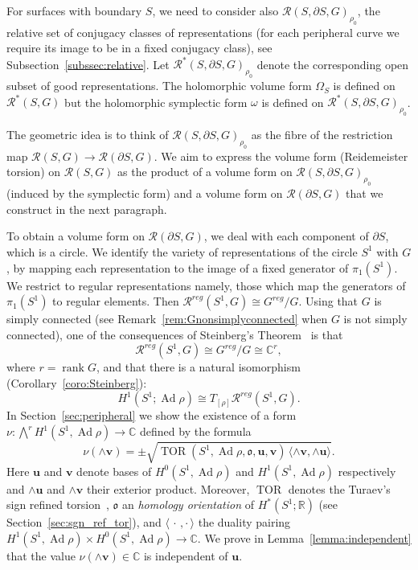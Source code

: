\documentclass[11pt]{article}
\theoremstyle{definition}
\numberwithin{equation}{section}
\numberwithin{figure}{section}
\numberwithin{table}{section}
\DeclareMathOperator{\TOR}{TOR}
\DeclareMathOperator{\Ad}{Ad}
\DeclareMathOperator{\rank}{rank}
\newcommand{\Rcal}{\mathcal{R}}
\newcommand{\Cbb}{\mathbb{C}}
\newcommand{\Rbb}{\mathbb {R}}
\newcommand{\ofrk}{\mathfrak{o}}
\newcommand{\ubf}{\mathbf{u}}
\newcommand{\vbf}{\mathbf{v}}
\newcommand*\Rg{\Rcal^*}
\begin{document}
For surfaces with boundary $S$, we need to consider also $\Rcal(S,\partial S,G)_{\rho_0}$, the relative set of conjugacy classes of representations (for each peripheral curve we require its image to be in a fixed conjugacy class), see Subsection~\ref{subssec:relative}. Let $\Rg(S,\partial S,G)_{\rho_0}$ denote the corresponding open subset of good representations. The holomorphic volume form $\Omega_S$ is defined on $\Rg(S,G)$ but the holomorphic symplectic form $\omega$ is defined on $\Rg(S,\partial S,G)_{\rho_0}$.

The geometric idea is to think of $\Rcal(S,\partial S,G)_{\rho_0}$ as the fibre of the restriction map $\Rcal(S,G)\to \Rcal(\partial S,G)$. We aim to express the volume form (Reidemeister torsion) on $\Rcal(S,G)$ as the product of a volume form on $\Rcal(S,\partial S,G)_{\rho_0}$ (induced by the symplectic form) and a volume form on $\Rcal(\partial S,G)$ that we construct in the next paragraph.

To obtain a volume form on $\Rcal(\partial S,G)$, we deal with each component of $\partial S$, which is a circle. We identify the variety of representations of the circle $S^1$ with $G$, by mapping each representation to the image of a fixed generator of $\pi_1(S^1)$. We restrict to regular representations namely, those which map the generators of $\pi_1(S^1)$ to regular elements. Then $
\Rcal^{reg}(S^1,G)\cong G^{reg}/ G $. Using that $G$ is simply connected (see Remark~\ref{rem:Gnonsimplyconnected} when $G$ is not simply connected), one of the consequences of Steinberg's Theorem~\cite{SteinbergIHES} is that
\[
\Rcal^{reg}(S^1,G)\cong G^{reg}/ G\cong \Cbb^r,
\]
where $r=\rank G$, and that there is a natural isomorphism (Corollary~\ref{coro:Steinberg}):
\[
H^1(S^1; \Ad\rho)\cong T_{ [\rho] } \Rcal^{reg}(S^1,G).
\]
In Section~\ref{sec:peripheral} we show the existence of a form $\nu\colon\bigwedge^{r} H^1(S^1,\Ad\rho)\to \Cbb$ defined by the formula
\begin{equation}\label{eqn:peripheral0}
\nu (\wedge\vbf)=\pm \sqrt{ \TOR(S^1,\Ad\rho, \ofrk,\ubf,\vbf)
\,\langle \wedge\vbf, \wedge\ubf \rangle }.
\end{equation}
Here $\ubf$ and $\vbf$ denote bases of $H^0(S^1,\Ad\rho)$ and $H^1(S^1,\Ad\rho) $ respectively and $\wedge\ubf$ and $\wedge \vbf$ their exterior product. Moreover, $\TOR$ denotes the Turaev's sign refined torsion~\cite[Section~3]{TuraevKnotTheory}, $\ofrk$ an \emph{homology orientation} of $H^*(S^1;\Rbb)$ (see Section~\ref{sec:sgn_ref_tor}), and $\langle\,\cdot\,,\cdot\,\rangle$ the duality pairing $ H^1(S^1,\Ad\rho)\times H^0(S^1,\Ad\rho)\to \Cbb$. We prove in Lemma~\ref{lemma:independent} that the value $\nu(\wedge\vbf)\in\Cbb$ is independent of $\ubf$.
\end{document}

